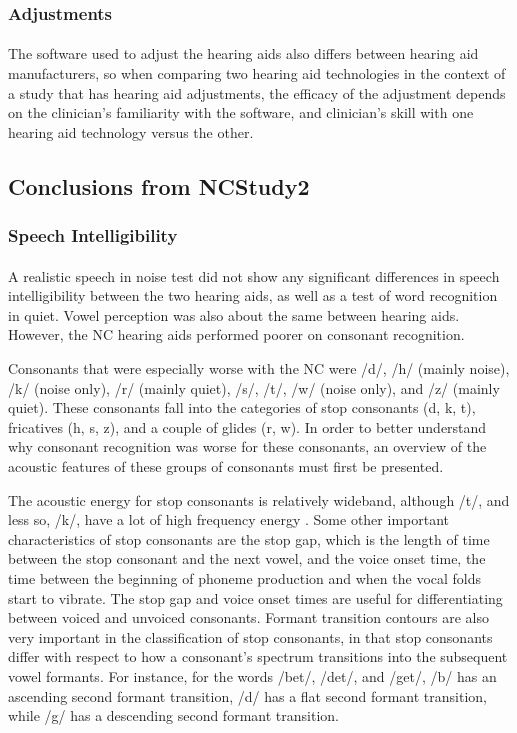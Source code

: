 \subsubsection{Adjustments}
\paragraph{}The software used to adjust the hearing aids also differs between hearing aid manufacturers, so when comparing two hearing aid technologies in the context of a study that has hearing aid adjustments, the efficacy of the adjustment depends on the clinician's familiarity with the software, and clinician's skill with one hearing aid technology versus the other.

\subsection{Conclusions from NCStudy2}
\subsubsection{Speech Intelligibility}
\paragraph{}A realistic speech in noise test did not show any significant differences in speech intelligibility between the two hearing aids, as well as a test of word recognition in quiet.  Vowel perception was also about the same between hearing aids.  However, the NC hearing aids performed poorer on consonant recognition.

Consonants that were especially worse with the NC were /d/, /h/ (mainly noise), /k/ (noise only), /r/ (mainly quiet), /s/, /t/, /w/ (noise only), and /z/ (mainly quiet).  These consonants fall into the categories of stop consonants (d, k, t), fricatives (h, s, z), and a couple of glides (r, w).  In order to better understand why consonant recognition was worse for these consonants, an overview of the acoustic features of these groups of consonants must first be presented.

The acoustic energy for stop consonants is relatively wideband, although /t/, and less so, /k/, have a lot of high frequency energy \cite{Hamill2008}.  Some other important characteristics of stop consonants are the stop gap, which is the length of time between the stop consonant and the next vowel, and the voice onset time, the time between the beginning of phoneme production and when the vocal folds start to vibrate.  The stop gap and voice onset times are useful for differentiating between voiced and unvoiced consonants.  Formant transition contours are also very important in the classification of stop consonants, in that stop consonants differ with respect to how a consonant's spectrum transitions into the subsequent vowel formants.  For instance, for the words /bet/, /det/, and /get/, /b/ has an ascending second formant transition, /d/ has a flat second formant transition, while /g/ has a descending second formant transition.

